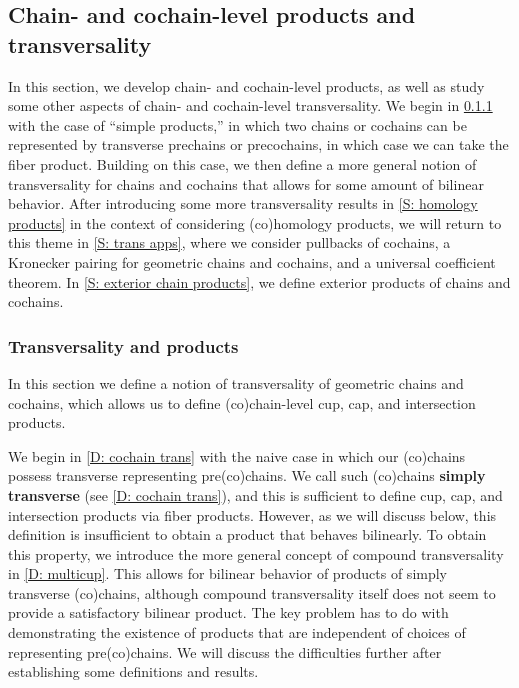 \subsection{Chain- and cochain-level products and transversality}\label{S: chain products}

In this section, we develop chain- and cochain-level products, as well as study some other aspects of chain- and cochain-level transversality.
We begin in \cref{S: simple products} with the case of ``simple products,'' in which two chains or cochains can be represented by transverse prechains or precochains, in which case we can take the fiber product.
Building on this case, we then define a more general notion of transversality for chains and cochains that allows for some amount of bilinear behavior.
After introducing some more transversality results in \cref{S: homology products} in the context of considering (co)homology products, we will return to this theme in \cref{S: trans apps}, where we consider pullbacks of cochains, a Kronecker pairing for geometric chains and cochains, and a universal coefficient theorem.
In \cref{S: exterior chain products}, we define exterior products of chains and cochains.


\subsubsection{Transversality and products}\label{S: simple products}
In this section we define a notion of transversality of geometric chains and cochains, which allows us to define (co)chain-level cup, cap, and intersection products.

We begin in \cref{D: cochain trans} with the naive case in which our (co)chains possess transverse representing pre(co)chains.
We call such (co)chains \textbf{simply transverse} (see \cref{D: cochain trans}), and this is sufficient to define cup, cap, and intersection products via fiber products.
However, as we will discuss below, this definition is insufficient to obtain a product that behaves bilinearly.
To obtain this property, we introduce the more general concept of compound transversality in \cref{D: multicup}.
This allows for bilinear behavior of products of simply transverse (co)chains, although compound transversality itself does not seem to provide a satisfactory bilinear product.
The key problem has to do with demonstrating the existence of products that are independent of choices of representing pre(co)chains.
We will discuss the difficulties further after establishing some definitions and results.

